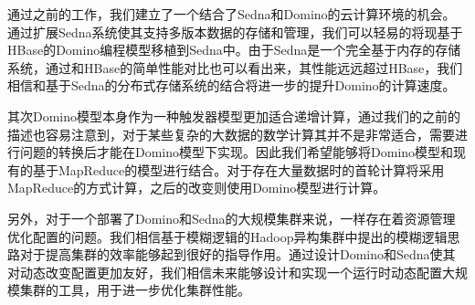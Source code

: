 通过之前的工作，我们建立了一个结合了Sedna和Domino的云计算环境的机会。通过扩展Sedna系统使其支持多版本数据的存储和管理，我们可以轻易的将现基于HBase的Domino编程模型移植到Sedna中。由于Sedna是一个完全基于内存的存储系统，通过和HBase的简单性能对比也可以看出来，其性能远远超过HBase，我们相信和基于Sedna的分布式存储系统的结合将进一步的提升Domino的计算速度。

其次Domino模型本身作为一种触发器模型更加适合递增计算，通过我们的之前的描述也容易注意到，对于某些复杂的大数据的数学计算其并不是非常适合，需要进行问题的转换后才能在Domino模型下实现。因此我们希望能够将Domino模型和现有的基于MapReduce的模型进行结合。对于存在大量数据时的首轮计算将采用MapReduce的方式计算，之后的改变则使用Domino模型进行计算。

另外，对于一个部署了Domino和Sedna的大规模集群来说，一样存在着资源管理优化配置的问题。我们相信基于模糊逻辑的Hadoop异构集群中提出的模糊逻辑思路对于提高集群的效率能够起到很好的指导作用。通过设计Domino和Sedna使其对动态改变配置更加友好，我们相信未来能够设计和实现一个运行时动态配置大规模集群的工具，用于进一步优化集群性能。


